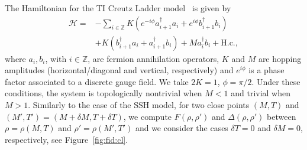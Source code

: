 The Hamiltonian for the TI Creutz Ladder model~\cite{cre:99,ber:pat:ami:del:09} is given by
\begin{eqnarray}
\mathcal{H}=& -\sum_{i\in\mathbb{Z}}K\left(e^{-i\phi}a_{i+1}^{\dagger}a_{i}+e^{i\phi}b_{i+1}^{\dagger}b_{i}\right)\nonumber\\
&+K(b_{i+1}^{\dagger}a_{i}+a_{i+1}^{\dagger}b_{i})+Ma_{i}^\dagger b_i +\text{H.c.},	
\end{eqnarray}
where $a_i,b_i$, with $i\in\mathbb{Z}$, are fermion annihilation operators, $K$ and $M$ are hopping amplitudes (horizontal/diagonal and vertical, respectively) and $e^{i\phi}$ is a phase factor associated to a discrete gauge field. We take $2K=1$, $\phi=\pi/2$. Under these conditions, the system is topologically nontrivial when $M<1$ and trivial when $M>1$. 
Similarly to the case of the SSH model, for two close points $(M,T)$ and $(M',T')=(M+\delta M, T+\delta T)$, we compute $F(\rho,\rho')$ and $\Delta(\rho,\rho')$ between $\rho=\rho(M,T)$ and $\rho'=\rho(M',T')$ and we consider the cases $\delta T = 0$ and $\delta M = 0$, respectively, see Figure~\ref{fig:fid:cl}.




